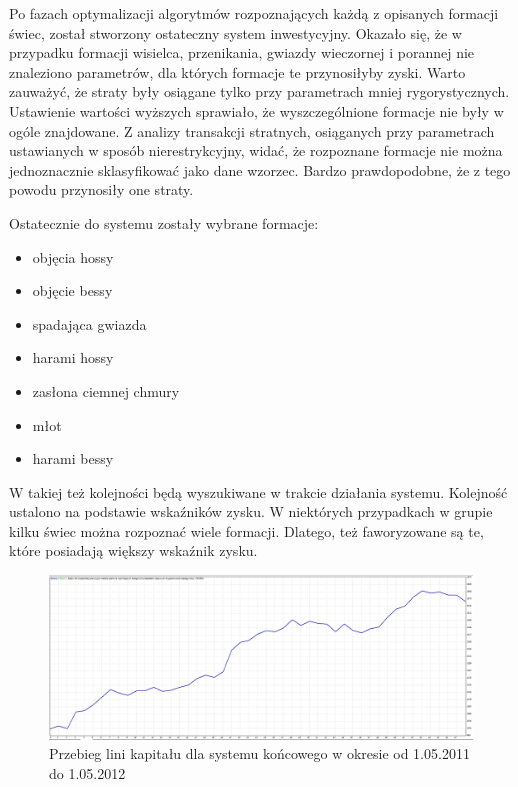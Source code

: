 \documentclass[pdflatex,11pt]{aghdpl}
\begin{document}
Po fazach optymalizacji algorytmów rozpoznających każdą z opisanych formacji świec, został stworzony ostateczny system inwestycyjny. Okazało się, że w przypadku formacji wisielca, przenikania, gwiazdy wieczornej i porannej nie znaleziono parametrów, dla których formacje te przynosiłyby zyski. Warto zauważyć, że straty były osiągane tylko przy parametrach mniej rygorystycznych. Ustawienie wartości wyższych sprawiało, że wyszczególnione formacje nie były w ogóle znajdowane. Z analizy transakcji stratnych, osiąganych przy parametrach ustawianych w sposób nierestrykcyjny, widać, że rozpoznane formacje nie można jednoznacznie sklasyfikować jako dane wzorzec. Bardzo prawdopodobne, że z tego powodu przynosiły one straty.

Ostatecznie do systemu zostały wybrane formacje:
\begin{itemize}
\item objęcia hossy
\item objęcie bessy
\item spadająca gwiazda
\item harami hossy
\item zasłona ciemnej chmury
\item młot
\item harami bessy
\end{itemize}
W takiej też kolejności będą wyszukiwane w trakcie działania systemu. Kolejność ustalono na podstawie wskaźników zysku. W niektórych przypadkach w grupie kilku świec można rozpoznać wiele formacji. Dlatego, też faworyzowane są te, które posiadają większy wskaźnik zysku.
\begin{figure}[h!]
\begin{center}
\includegraphics[width=16cm]{wszystkie/linia_kap.png}
\caption{Przebieg lini kapitału dla systemu końcowego w okresie od 1.05.2011 do 1.05.2012}
\label{system_linia_kap}
\end{center}
\end{figure}
\end{document}
